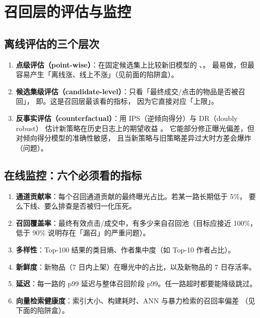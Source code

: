 \section{召回层的评估与监控}

\subsection{离线评估的三个层次}

\begin{enumerate}
  \item \textbf{点级评估（point-wise）}：在固定候选集上比较新旧模型的 、。
        最易做，但最容易产生「离线涨、线上不涨」（见前面的陷阱盒）。
  \item \textbf{候选集级评估（candidate-level）}：只看「最终成交/点击的物品是否被召回」，
        即。这是召回层最该看的指标，
        因为它直接对应「上限」。
  \item \textbf{反事实评估（counterfactual）}：用 IPS（逆倾向得分）与 DR（doubly robust）
        估计新策略在历史日志上的期望收益 \cite{swaminathan2015counterfactual,saito2020doubly}。
        它能部分修正曝光偏差，但对倾向得分模型的准确性敏感，
        且当新策略与旧策略差异过大时方差会爆炸（问题）。
\end{enumerate}

\subsection{在线监控：六个必须看的指标}

\begin{keypoint}[召回层上线监控清单]
\begin{enumerate}
  \item \textbf{通道贡献率}：每个召回通道贡献的最终曝光占比。若某一路长期低于 5\%，
        要么下线、要么排查是否被归一化压死。
  \item \textbf{召回覆盖率}：最终有效点击/成交中，有多少来自召回池（目标应接近 100\%，
        低于 90\% 说明存在「漏召」的严重问题）。
  \item \textbf{多样性}：Top-100 结果的类目熵、作者集中度（如 Top-10 作者占比）。
  \item \textbf{新鲜度}：新物品（7 日内上架）在曝光中的占比，以及新物品的 7 日存活率。
  \item \textbf{延迟}：每一路的 p99 延迟与整体召回阶段 p99。任一路超时都要能降级跳过。
  \item \textbf{向量检索健康度}：索引大小、构建耗时、ANN 与暴力检索的召回率偏差
        （见下面的陷阱盒）。
\end{enumerate}
\end{keypoint}

